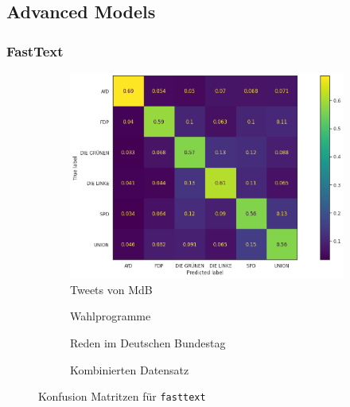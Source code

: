 \subsection{Advanced Models}

\subsubsection*{FastText}


\begin{figure}[H]
    \begin{subfigure}{.5\textwidth}
      \centering
      \includegraphics[width=0.9\linewidth]{data/images/tweets/fasttext_tweets_confusion.png}
      \caption{Tweets von \acs{MdB}} \label{sfig:confusionMatrixFastTextTweets}
    \end{subfigure}
    \begin{subfigure}{.5\textwidth}
      \centering
      \caption{Wahlprogramme} \label{sfig:confusionMatrixFastTextManifest}
    \end{subfigure}
    \begin{subfigure}{.5\textwidth}
      \centering
      \caption{Reden im Deutschen Bundestag} \label{sfig:confusionMatrixFastTextSpeeches}
    \end{subfigure}
    \begin{subfigure}{.5\textwidth}
      \centering
      \caption{Kombinierten Datensatz} \label{sfig:confusionMatrixFastTextAll}
    \end{subfigure}
    \caption{Konfusion Matritzen für \texttt{fasttext}} \label{fig:confusionMatrixFastText}
\end{figure}

